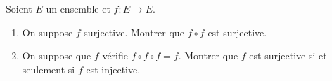 \begin{enonce}
\begin{exercise}[ID={RMS 121.2 1107, CCP PC 2010},subtitle={},tags={}]
Soient $E$ un ensemble et $f:E\to E$.
\begin{enumerate}
    \item On suppose $f$ surjective. Montrer que $f\circ f$ est surjective.
    \item On suppose que $f$ vérifie $f\circ f\circ f=f$. Montrer que $f$ est surjective si et seulement si $f$ est injective.
\end{enumerate}
\end{exercise}
\begin{solution}
\end{solution}
\end{enonce}
